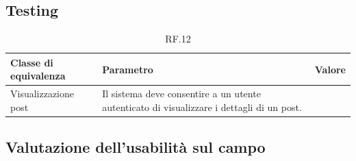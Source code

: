 \documentclass{natourDoc}
\begin{document}
\subsection{Testing}
\begin{table}[H]
	\centering
	\begin{tabular}{ |X|X|X| }
		\hline
		\rowcolor{PineGreen!70}
		\textbf{Classe di equivalenza}        & \textbf{Parametro}          &\textbf{Valore}                           \\
		\hline
		Visualizzazione post 				  & Il sistema deve consentire a un utente autenticato di visualizzare i dettagli di un post.   &    \\
	\end{tabular}
	\caption{RF.12}
\end{table}


\subsection{Valutazione dell'usabilità sul campo}
\end{document}
